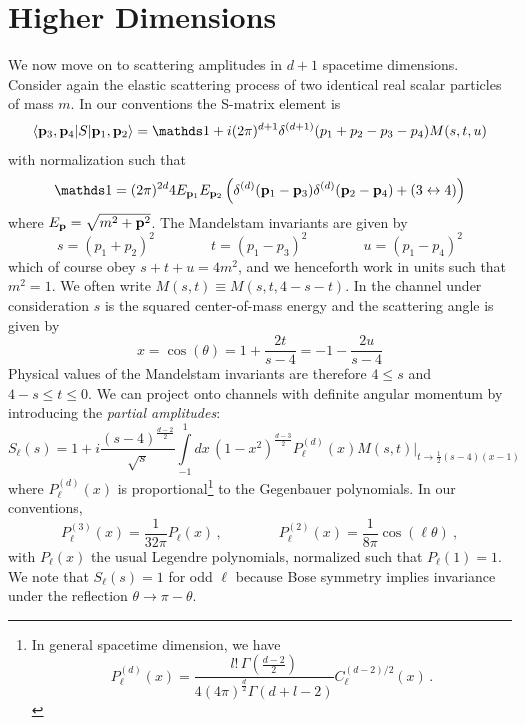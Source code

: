 \documentclass[12pt]{article}
\newcommand{\begBvR}[1]{\begin{#1}}
\newcommand{\beq}{\begBvR{equation}}
\newcommand{\eeq}{\end{equation}}
\newcommand{\la}[1]{\label{#1}}
\newcommand{\<}{{\langle}}
\renewcommand{\>}{{\rangle}}
\def\<{\langle}
\def\>{\rangle}
\def\bp{{\bf p}}
\begin{document}
\section{Higher Dimensions}  \la{sec3}
We now move on to scattering amplitudes in $d+1$ spacetime dimensions. Consider again the elastic scattering process of two identical real scalar particles of mass $m$. In our conventions the S-matrix element is
\beq \label{eq:Smatrixel}
\< \bp_3, \bp_4 | S | \bp_1, \bp_2  \> = {\mathds 1} + i(2\pi)^{d+1} \delta^{(d+1)}(p_1 + p_2 - p_3 - p_4) M(s,t,u)
\eeq
with normalization such that 
\beq
{\mathds 1} = (2 \pi)^{2d} 4 E_{\bp_1} E_{\bp_2} \left( \delta^{(d)}(\bp_1 - \bp_3) \delta^{(d)}(\bp_2 - \bp_4)  + (3 \leftrightarrow 4)  \right) 
\eeq
where $E_{\bp}=\sqrt{m^2+\bp^2}$. The Mandelstam invariants are given by
\beq
s = (p_1 + p_2)^2 \qquad \qquad t = (p_1 - p_3)^2 \qquad \qquad u = (p_1 - p_4)^2
\eeq
which of course obey $s + t + u = 4 m^2$, and we henceforth work in units such that $m^2 = 1$. We often write $M(s,t) \equiv M(s,t,4 - s - t)$. In the channel under consideration $s$ is the squared center-of-mass energy and the scattering angle is given by
\beq
x = \cos(\theta) = 1 + \frac{2 t}{s - 4} = - 1 - \frac{2 u}{s - 4}
\eeq
Physical values of the Mandelstam invariants are therefore $4 \leq s$ and $4 - s \leq t \leq 0$. We can project onto channels with definite angular momentum by introducing the \emph{partial amplitudes}:
\beq
\label{eq:partialwaves}
S_\ell(s)= 1+ i \frac{(s-4)^\frac{d-2}{2}}{ \sqrt{s}}   \int\limits_{-1}^1\! dx\, (1-x^2)^{\frac{d-3}{2}}P^{(d)}_\ell(x) \left. M(s, t)\right|_{t\to \tfrac{1}{2}(s-4) (x-1)}
\eeq
where $P_\ell^{(d)}(x)$ is proportional\footnote{In general spacetime dimension, we have
$$P_\ell^{(d)}(x)=
\frac{l! \,\Gamma (\frac{d-2}{2} )}{4 (4\pi)^{\frac{d}{2}} \Gamma(d+l-2)} C^{(d-2)/2}_\ell(x)\,.
$$}
 to the Gegenbauer polynomials. In our conventions,
\beq
P^{(3)}_\ell(x) =\frac{1}{32\pi}   P_\ell(x)\,, \qquad \qquad  P^{(2)}_\ell(x) = \frac{1}{8\pi}  
\cos(\ell \theta)\ ,
\eeq
with $P_\ell(x)$ the usual Legendre polynomials, normalized such that $P_\ell(1) = 1$. We note that $S_\ell(s) = 1$ for odd $\ell$ because Bose symmetry implies invariance under the reflection $\theta \to \pi - \theta$.
\end{document}
